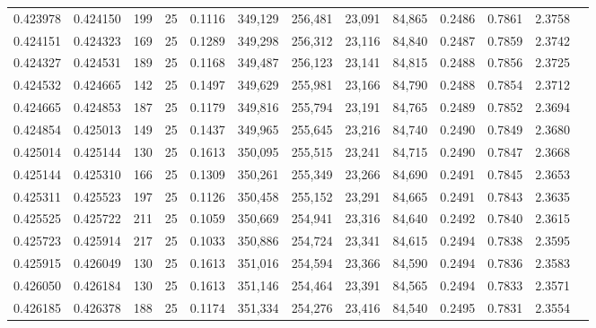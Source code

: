\begin{tabular}{rrrrrrrrrrrrr}
0.423978 & 0.424150 &   199 &  25 &                                     0.1116 & 349,129 & 256,481 &  23,091 &  84,865 & 0.2486 & 0.7861 & 2.3758 \\
0.424151 & 0.424323 &   169 &  25 &                                     0.1289 & 349,298 & 256,312 &  23,116 &  84,840 & 0.2487 & 0.7859 & 2.3742 \\
0.424327 & 0.424531 &   189 &  25 &                                     0.1168 & 349,487 & 256,123 &  23,141 &  84,815 & 0.2488 & 0.7856 & 2.3725 \\
0.424532 & 0.424665 &   142 &  25 &                                     0.1497 & 349,629 & 255,981 &  23,166 &  84,790 & 0.2488 & 0.7854 & 2.3712 \\
0.424665 & 0.424853 &   187 &  25 &                                     0.1179 & 349,816 & 255,794 &  23,191 &  84,765 & 0.2489 & 0.7852 & 2.3694 \\
0.424854 & 0.425013 &   149 &  25 &                                     0.1437 & 349,965 & 255,645 &  23,216 &  84,740 & 0.2490 & 0.7849 & 2.3680 \\
0.425014 & 0.425144 &   130 &  25 &                                     0.1613 & 350,095 & 255,515 &  23,241 &  84,715 & 0.2490 & 0.7847 & 2.3668 \\
0.425144 & 0.425310 &   166 &  25 &                                     0.1309 & 350,261 & 255,349 &  23,266 &  84,690 & 0.2491 & 0.7845 & 2.3653 \\
0.425311 & 0.425523 &   197 &  25 &                                     0.1126 & 350,458 & 255,152 &  23,291 &  84,665 & 0.2491 & 0.7843 & 2.3635 \\
0.425525 & 0.425722 &   211 &  25 &                                     0.1059 & 350,669 & 254,941 &  23,316 &  84,640 & 0.2492 & 0.7840 & 2.3615 \\
0.425723 & 0.425914 &   217 &  25 &                                     0.1033 & 350,886 & 254,724 &  23,341 &  84,615 & 0.2494 & 0.7838 & 2.3595 \\
0.425915 & 0.426049 &   130 &  25 &                                     0.1613 & 351,016 & 254,594 &  23,366 &  84,590 & 0.2494 & 0.7836 & 2.3583 \\
0.426050 & 0.426184 &   130 &  25 &                                     0.1613 & 351,146 & 254,464 &  23,391 &  84,565 & 0.2494 & 0.7833 & 2.3571 \\
0.426185 & 0.426378 &   188 &  25 &                                     0.1174 & 351,334 & 254,276 &  23,416 &  84,540 & 0.2495 & 0.7831 & 2.3554 \\

\end{tabular}
